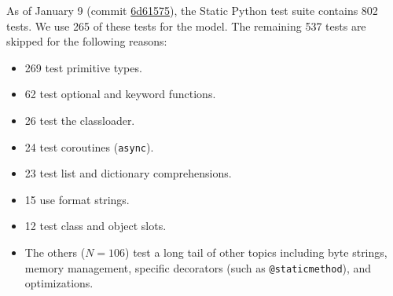 \documentclass[english,cleveref,crc]{programming}
\newcommand{\SP}{Static Python}
\newcommand{\code}[1]{\texttt{#1}}
\newcommand{\nnum}[1]{$N=#1$}
\newcommand{\numSPtest}{265}
\newcommand{\numSPtotal}{802} %
\newcommand{\numSPdiff}{537} %
\begin{document}
As of January 9 (commit \href{https://github.com/facebookincubator/cinder/commit/6d61575e28b2d1f31a197f883486c5f012de98c1}{6d61575}),
the \SP{} test suite contains \numSPtotal{} tests.
We use \numSPtest{} of these tests for the model.
The remaining \numSPdiff{} tests are skipped for the following reasons:

\begin{itemize}
  \item 269 test primitive types.
  \item 62 test optional and keyword functions.
  \item 26 test the classloader.
  \item 24 test coroutines (\code{async}).
  \item 23 test list and dictionary comprehensions.
  \item 15 use format strings.
  \item 12 test class and object slots.
  \item The others (\nnum{106}) test a long tail of other topics
    including byte strings, memory management, specific decorators
    (such as \code{@staticmethod}), and optimizations.


\end{itemize}
\end{document}
